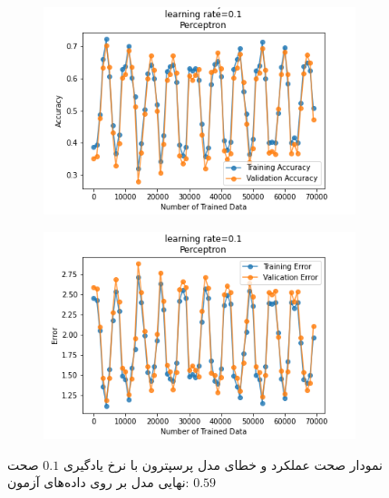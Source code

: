 \documentclass[12pt, a4paper]{article}
\begin{document}
\begin{figure}[h]
    \begin{subfigure}{0.45\linewidth}
        \centering
        \includegraphics[width=\linewidth]{images/5/perceptron/lr/acc_0.1.png}
    \end{subfigure}
    \hfil
    \begin{subfigure}{0.45\linewidth}
        \centering
        \includegraphics[width=\linewidth]{images/5/perceptron/lr/error_0.1.png}
    \end{subfigure}
    \caption{نمودار صحت عملکرد‌ و خطای مدل پرسپترون با نرخ یادگیری $0.1$
    \newline
    صحت نهایی مدل بر روی داده‌های آزمون: $0.59$}
\end{figure}
\end{document}
